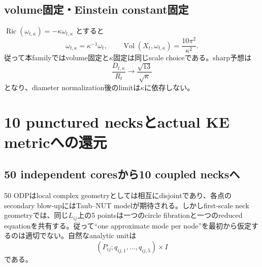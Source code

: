 \documentclass[11pt,a4paper]{ltjsarticle}
\theoremstyle{definition}
\theoremstyle{remark}
\newcommand{\Vol}{\operatorname{Vol}}
\newcommand{\Ric}{\operatorname{Ric}}
\begin{document}
\subsection{volume固定・Einstein constant固定}

$\Ric(\omega_{t,\kappa})=-\kappa\omega_{t,\kappa}$ とすると
\[
 \omega_{t,\kappa}=\kappa^{-1}\omega_t,
 \qquad
 \Vol(X_t,\omega_{t,\kappa})=\frac{10\pi^2}{\kappa^2}.
\]
従って本familyではvolume固定と$\kappa$固定は同じscale choiceである。sharp予想は
\[
 \frac{D_{t,\kappa}}{R_t}\longrightarrow\frac{\sqrt{13}}{\sqrt\kappa}
\]
となり、diameter normalization後のlimitは$\kappa$に依存しない。

\section{10 punctured necksとactual KE metricへの還元}
\label{sec:PNP}

\subsection{50 independent coresから10 coupled necksへ}

50 ODPはlocal complex geometryとしては相互にdisjointであり、各点のsecondary blow-upにはTaub--NUT modelが期待される。しかしfirst-scale neck geometryでは、同じ$L_{ij}$上の5 pointsは一つのcircle fibrationと一つのreduced equationを共有する。従って``one approximate mode per node''を最初から仮定するのは適切でない。自然なanalytic unitは
\[
 (P_{ij};q_{ij,1},\ldots,q_{ij,5})\times I
\]
である。
\end{document}
